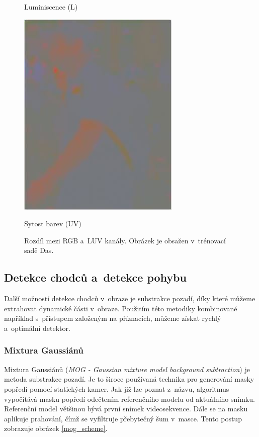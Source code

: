 \begin{figure}[H]
\begin{minipage}[b]{.3\textwidth}
  \caption*{Luminiscence (L)}
\end{minipage}
\begin{minipage}[b]{.3\textwidth}
  \centering
  \includegraphics[width=.8\linewidth]{figures/uv_chroma}
  \caption*{Sytost barev (UV)}
\end{minipage}
\caption{Rozdíl mezi RGB a~LUV kanály. Obrázek je obsažen v~trénovací sadě Das\cite{sudipdas}.}
\label{fig:luv}
\end{figure}

\subsection{Detekce chodců a~detekce pohybu} %
Další možností detekce chodců v~obraze je substrakce pozadí, díky které můžeme extrahovat dynamické části v~obraze. Použitím této metodiky kombinované například s~přístupem založeným na příznacích, můžeme získat rychlý a~optimální detektor.

\subsubsection*{Mixtura Gaussiánů}
Mixtura Gaussiánů (\textit{MOG - Gaussian mixture model background subtraction}) \cite{mog:zivkovic} je metoda substrakce pozadí. Je to široce používaná technika pro generování masky popředí pomocí statických kamer. Jak již lze poznat z~názvu, algoritmus vypočítává masku popředí odečtením referenčního modelu od aktuálního snímku. Referenční model většinou bývá první snímek videosekvence. Dále se na masku aplikuje prahování, čímž se vyfiltruje přebytečný šum v~masce. Tento postup zobrazuje obrázek \ref{mog_scheme}.


